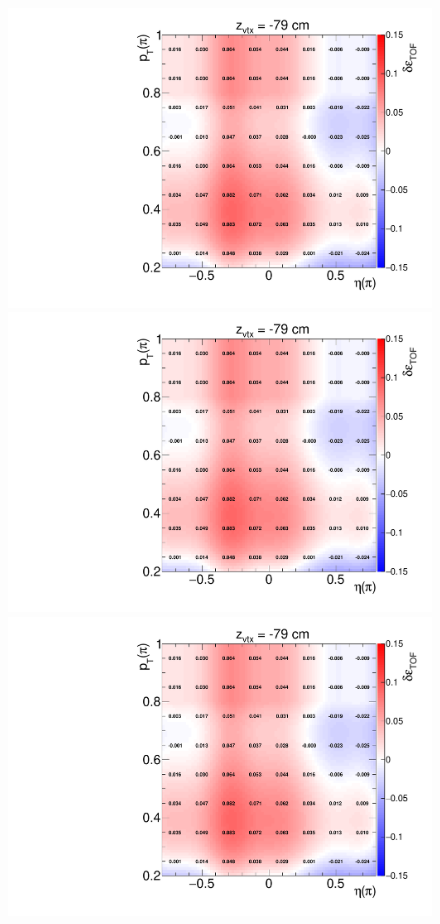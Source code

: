 \begin{figure}
{	}%
	\parbox{0.325\textwidth}{
		\centering
		\includegraphics[width=\linewidth,page=10]{graphics/systematicsEfficiency/TOF_tagAndProbe/correction/TofEffCorrection3D_pion.pdf}\\
		\includegraphics[width=\linewidth,page=25]{graphics/systematicsEfficiency/TOF_tagAndProbe/correction/TofEffCorrection3D_pion.pdf}\\
		\includegraphics[width=\linewidth,page=40]{graphics/systematicsEfficiency/TOF_tagAndProbe/correction/TofEffCorrection3D_pion.pdf}\\
}
\end{figure}

